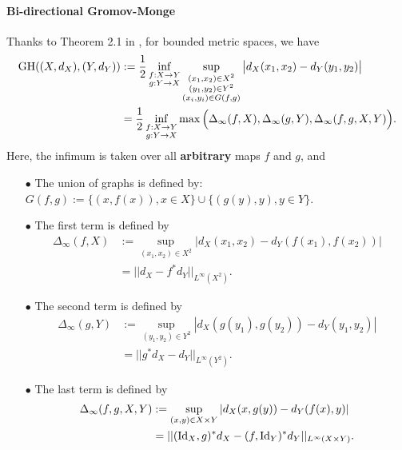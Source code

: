 \paragraph{Bi-directional Gromov-Monge}
Thanks to Theorem 2.1 in \citep{Kalton99}, for bounded metric spaces, we have
\begin{equation} \label{kalton_form}
  \begin{split}
    \text{GH}((X,d_X), (Y,d_Y)) &:= \frac{1}{2} \inf_{\substack{f: X \to Y \\ g: Y \to X}}
    \sup_{\substack{(x_1, x_2) \in X^2 \\ (y_1, y_2) \in Y^2 \\
    (x_i, y_i) \in G(f,g)}} \big| d_X(x_1, x_2) - d_Y(y_1, y_2) \big| \\
    &= \frac{1}{2} \inf_{\substack{f: X \to Y \\ g: Y \to X}}
    \max \Big( \Delta_{\infty}(f, X), \Delta_{\infty}(g, Y), \Delta_{\infty}(f,g, X, Y) \Big).
  \end{split}
\end{equation}
Here, the infimum is taken over all \textbf{arbitrary} maps $f$ and $g$, and
\begin{itemize}
  \item[$\bullet$] The union of graphs is defined by:
  $G(f,g) := \{(x, f(x)), x \in X\} \cup \{(g(y), y), y \in Y \}$.

  \item[$\bullet$] The first term is defined by
  \begin{equation*}
    \begin{split}
      \Delta_{\infty}(f, X) &:=
      \sup_{(x_1, x_2) \in X^2} \left| d_X(x_1, x_2) - d_Y(f(x_1), f(x_2)) \right| \\
      &= || d_X - f^* d_Y ||_{L^{\infty}(X^2)}.
    \end{split}
  \end{equation*}

  \item[$\bullet$] The second term is defined by
  \begin{equation*}
    \begin{split}
      \Delta_{\infty}(g, Y) &:= \sup_{(y_1, y_2) \in Y^2}
      \left| d_X(g(y_1), g(y_2)) - d_Y(y_1, y_2) \right| \\
      &= || g^*d_X - d_Y ||_{L^{\infty}(Y^2)}.
    \end{split}
  \end{equation*}

  \item[$\bullet$] The last term is defined by
  \begin{equation*}
    \begin{split}
      \Delta_{\infty}(f,g, X, Y)
      &:= \sup_{(x, y) \in X \times Y} \left| d_X(x, g(y)) - d_Y(f(x),y) \right| \\
      &= || (\text{Id}_X, g)^*d_X - (f, \text{Id}_Y)^*d_Y ||_{L^{\infty}(X \times Y)}.
    \end{split}
  \end{equation*}
\end{itemize}
